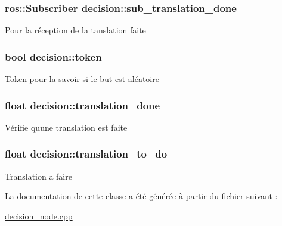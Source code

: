 \subsubsection[{\texorpdfstring{sub\+\_\+translation\+\_\+done}{sub_translation_done}}]{\setlength{\rightskip}{0pt plus 5cm}ros\+::\+Subscriber decision\+::sub\+\_\+translation\+\_\+done\hspace{0.3cm}{\ttfamily [private]}}\hypertarget{classdecision_abec51fe792a7230e4afe73dca2eb83dd}{}\label{classdecision_abec51fe792a7230e4afe73dca2eb83dd}
Pour la réception de la tanslation faite 
\subsubsection[{\texorpdfstring{token}{token}}]{\setlength{\rightskip}{0pt plus 5cm}bool decision\+::token\hspace{0.3cm}{\ttfamily [private]}}\hypertarget{classdecision_ad347764216715ba6d588aa4000cda267}{}\label{classdecision_ad347764216715ba6d588aa4000cda267}
Token pour la savoir si le but est aléatoire 
\subsubsection[{\texorpdfstring{translation\+\_\+done}{translation_done}}]{\setlength{\rightskip}{0pt plus 5cm}float decision\+::translation\+\_\+done\hspace{0.3cm}{\ttfamily [private]}}\hypertarget{classdecision_a7917b74f63ec0ad3d43ceb7d06a56f0c}{}\label{classdecision_a7917b74f63ec0ad3d43ceb7d06a56f0c}
Vérifie qu\textquotesingle{}une translation est faite 
\subsubsection[{\texorpdfstring{translation\+\_\+to\+\_\+do}{translation_to_do}}]{\setlength{\rightskip}{0pt plus 5cm}float decision\+::translation\+\_\+to\+\_\+do\hspace{0.3cm}{\ttfamily [private]}}\hypertarget{classdecision_ad49356a943ddd0a5e11cef4fe00ab201}{}\label{classdecision_ad49356a943ddd0a5e11cef4fe00ab201}
Translation a faire 

La documentation de cette classe a été générée à partir du fichier suivant \+:\begin{DoxyCompactItemize}
\item 
\hyperlink{decision__node_8cpp}{decision\+\_\+node.\+cpp}\end{DoxyCompactItemize}
